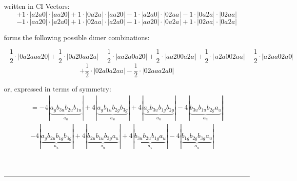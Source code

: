 \documentclass{article}
\begin{document}
\begin{minipage}{\linewidth}
written in CI Vectors: 
 $$+ 1 \cdot \left|a2a0 \right| \cdot \left| aa20 \right| 
+ 1 \cdot \left|0a2a \right| \cdot \left| aa20 \right| 
- 1 \cdot \left|a2a0 \right| \cdot \left| 02aa \right| 
- 1 \cdot \left|0a2a \right| \cdot \left| 02aa \right| 
 $$ $$ - 1 \cdot \left|aa20 \right| \cdot \left| a2a0 \right| 
+ 1 \cdot \left|02aa \right| \cdot \left| a2a0 \right| 
- 1 \cdot \left|aa20 \right| \cdot \left| 0a2a \right| 
+ 1 \cdot \left|02aa \right| \cdot \left| 0a2a \right| 
$$



 forms the following possible dimer combinations:

$$- \frac{1}{2} \cdot \left|0a2aaa20 \right| + \frac{1}{2} \cdot \left|0a20aa2a \right| - \frac{1}{2} \cdot \left|aa2a0a20 \right| + \frac{1}{2} \cdot \left|aa200a2a \right| + \frac{1}{2} \cdot \left|a2a002aa \right| - \frac{1}{2} \cdot \left|a2aa02a0 \right|  $$ $$ + \frac{1}{2} \cdot \left|02a0a2aa \right| - \frac{1}{2} \cdot \left|02aaa2a0 \right| $$



\end{minipage}
\vspace{0.5cm}


or, expressed in terms of symmetry:\begin{multline*}
=-4\left|\underbrace{a_{g} b_{3u} b_{2u} b_{1u}}_{a_{u}}\right|+4\left|\underbrace{a_{g} b_{1u} b_{2g} b_{3g}}_{a_{u}}\right|+4\left|\underbrace{a_{g} b_{3u} b_{1g} b_{2g}}_{a_{u}}\right|-4\left|\underbrace{b_{3u} b_{1u} b_{2g} a_{u}}_{a_{u}}\right|\\
-4\left|\underbrace{a_{g} b_{2u} b_{1g} b_{3g}}_{a_{u}}\right|+4\left|\underbrace{b_{2u} b_{1u} b_{3g} a_{u}}_{a_{u}}\right|+4\left|\underbrace{b_{3u} b_{2u} b_{1g} a_{u}}_{a_{u}}\right|-4\left|\underbrace{b_{1g} b_{2g} b_{3g} a_{u}}_{a_{u}}\right|
\end{multline*}\\\\

 


\hrule
\vspace{0.5cm}
\end{document}
